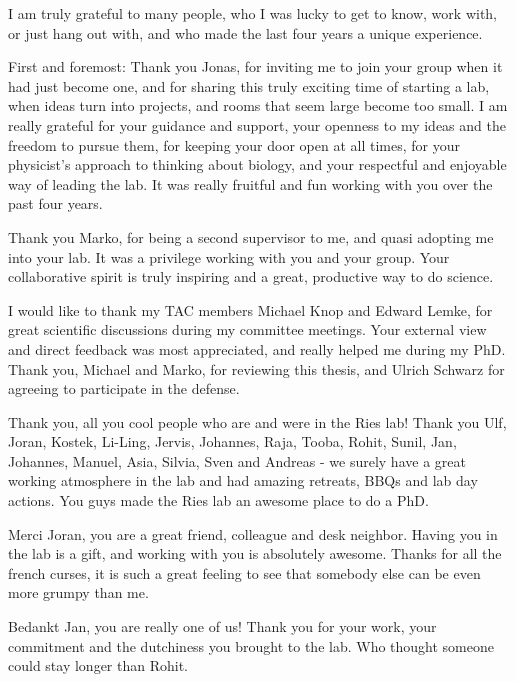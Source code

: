 \documentclass[
11pt, %
ngerman,
english, %
onehalfspacing,
hidelinks,
toctotoc, %
headsepline, %
]{MastersDoctoralThesis} %
\begin{document}
\begin{acknowledgements}
\addchaptertocentry{\acknowledgementname} %

I am truly grateful to many people, who I was lucky to get to know, work with, or just hang out with, and who made the last four years a unique experience.

First and foremost: Thank you Jonas, for inviting me to join your group when it had just become one, and for sharing this truly exciting time of starting a lab, when ideas turn into projects, and rooms that seem large become too small. I am really grateful for your guidance and support, your openness to my ideas and the freedom to pursue them, for keeping your door open at all times, for your physicist's approach to thinking about biology, and your respectful and enjoyable way of leading the lab. It was really fruitful and fun working with you over the past four years. 

Thank you Marko, for being a second supervisor to me, and quasi adopting me into your lab. It was a privilege working with you and your group. Your collaborative spirit is truly inspiring and a great, productive way to do science. 

I would like to thank my TAC members Michael Knop and Edward Lemke, for great scientific discussions during my committee meetings. Your external view and direct feedback was most appreciated, and really helped me during my PhD. Thank you, Michael and Marko, for reviewing this thesis, and Ulrich Schwarz for agreeing to participate in the defense.

Thank you, all you cool people who are and were in the Ries lab! Thank you Ulf, Joran, Kostek, Li-Ling, Jervis, Johannes, Raja, Tooba, Rohit, Sunil, Jan, Johannes, Manuel, Asia, Silvia, Sven and Andreas - we surely have a great working atmosphere in the lab and had amazing retreats, BBQs and lab day actions. You guys made the Ries lab an awesome place to do a PhD.

Merci Joran, you are a great friend, colleague and desk neighbor. Having you in the lab is a gift, and working with you is absolutely awesome. Thanks for all the french curses, it is such a great feeling to see that somebody else can be even more grumpy than me.

Bedankt Jan, you are really one of us! Thank you for your work, your commitment and the dutchiness you brought to the lab. Who thought someone could stay longer than Rohit. 


\end{acknowledgements}
\end{document}
